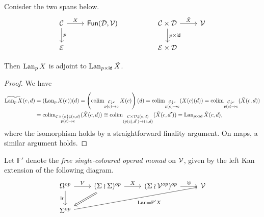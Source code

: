 \documentclass[a4paper,10pt
,draft
]{article}%
\begin{document}
\begin{lemma}
      \label{SPAN_LAN_LEM}
      Conisder the two spans below.
      \begin{equation}
            \begin{tikzcd}
                  \C \arrow[d, "p"] \arrow[r, "X"]
                  &
                  \mathsf{Fun}(\mathcal D, \V)
                  &&
                  \C \times \mathcal D \arrow[d, "p \times \mathsf{id}"] \arrow[r, "\tilde X"]
                  &
                  \V
                  \\
                  \mathcal E
                  &
                  &&
                  \mathcal E \times \mathcal D
            \end{tikzcd}
      \end{equation}
      
      Then $\operatorname{Lan}_p X$ is adjoint to $\operatorname{Lan}_{p \times \mathsf{id}} \tilde X$. 
\end{lemma}
\begin{proof}
      We have
      \begin{align}
        \widetilde{\operatorname{Lan}_p X}(e,d)
        &= (\operatorname{Lan}_p X(e))(d)
          = \left(
          \operatorname{colim}\limits_{\substack{ \mathcal{C} \downarrow e \\ p(c) \to e}} X(c)
        \right)(d)
        = \operatorname{colim}\limits_{\substack{ \mathcal{C} \downarrow e \\ p(c) \to e}}(X(c)(d))
        = \operatorname{colim}\limits_{\substack{ \mathcal{C} \downarrow e \\ p(c) \to e}}(\tilde X(c,d))\\
        &= \operatorname{colim}\limits_{\substack{ \mathcal{C} \times \left\{d\right\} \downarrow (e,d) \\ p(c) \to e}}(\tilde X(c,d))
        \cong \operatorname{colim}\limits_{\substack{ \mathcal{C} \times \mathcal D \downarrow (e,d) \\ (p(c),d') \to (e,d)}}(\tilde X(c,d'))
        = \operatorname{Lan}_{p \times \mathsf{id}}\tilde X(c,d),
      \end{align}
      where the isomorphism holds by a straightforward finality argument.
      On maps, a similar argument holds.
\end{proof}

\begin{notation}[\cite{BP17}]
      Let $\mathbb F'$ denote the \textit{free single-coloured operad monad} on $\mathcal V$, given by the left Kan extension of the following diagram.
      \begin{equation}
            \begin{tikzcd}
                  \Omega^{op}
                  \arrow[d, "\mathsf{lr}"']
                  \arrow[r, "V"]
                  &
                  (\Sigma \wr \Sigma)^{op} \arrow[r, "X"]
                  \arrow[dl, Rightarrow]
                  &
                  (\Sigma \wr \V^{op})^{op} \arrow[r, "\otimes"]
                  &
                  \V
                  \\
                  \Sigma^{op} \arrow[urrr, "\Lan = \mathbb F' X"']
            \end{tikzcd}
      \end{equation}
\end{notation}
\end{document}
